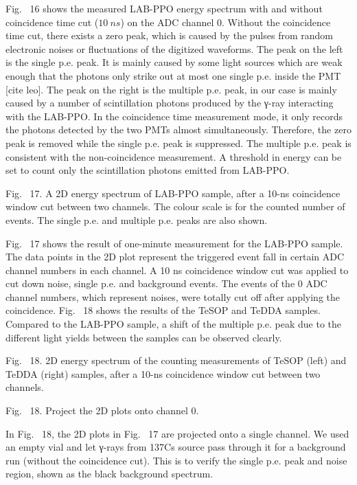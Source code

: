 Fig.~ 16 shows the measured LAB-PPO energy spectrum with and without coincidence time cut ($10~ns$) on the ADC channel 0.  Without the coincidence time cut, there exists a zero peak, which is caused by the pulses from random electronic noises or fluctuations of the digitized waveforms. The peak on the left is the single p.e. peak. It is mainly caused by some light sources which are weak enough that the photons only strike out at most one single p.e. inside the PMT [cite leo].  The peak on the right is the multiple p.e. peak, in our case is mainly caused by a number of scintillation photons produced by the γ-ray interacting with the LAB-PPO. In the coincidence time measurement mode, it only records the photons detected by the two PMTs almost simultaneously. Therefore, the zero peak is removed while the single p.e. peak is suppressed. The multiple p.e. peak is consistent with the non-coincidence measurement.  A threshold in energy can be set to count only the scintillation photons emitted from LAB-PPO. 


Fig.~ 17. A 2D energy spectrum of LAB-PPO sample, after a 10-ns coincidence window cut between two channels. The colour scale is for the counted number of events. The single p.e. and multiple p.e. peaks are also shown.

Fig.~ 17 shows the result of one-minute measurement for the LAB-PPO sample. The data points in the 2D plot represent the triggered event fall in certain ADC channel numbers in each channel. A 10 ns coincidence window cut was applied to cut down noise, single p.e. and background events. The events of the 0 ADC channel numbers, which represent noises, were totally cut off after applying the coincidence. Fig.~ 18 shows the results of the TeSOP and TeDDA samples.  Compared to the LAB-PPO sample, a shift of the multiple p.e. peak due to the different light yields between the samples can be observed clearly.



Fig.~ 18. 2D energy spectrum of the counting measurements of TeSOP (left) and TeDDA (right) samples, after a 10-ns coincidence window cut between two channels.



Fig.~ 18. Project the 2D plots onto channel 0.

In Fig.~ 18, the 2D plots in Fig.~ 17 are projected onto a single channel. We used an empty vial and let γ-rays from 137Cs source pass through it for a background run (without the coincidence cut). This is to verify the single p.e. peak and noise region, shown as the black background spectrum.

